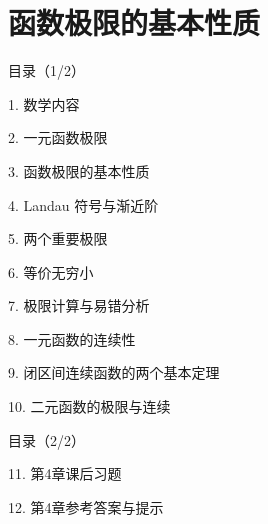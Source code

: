 \documentclass[aspectratio=169,10pt,fontset=fandol]{ctexbeamer}
\begin{document}
\section{函数极限的基本性质}
\begin{frame}[t,fragile]{目录（1/2）}
\normalsize
{\color{black}\normalsize 1. 数学内容\par}\vspace{0.3em}
{\color{black}\normalsize 2. 一元函数极限\par}\vspace{0.3em}
{\color{blue}\normalsize 3. 函数极限的基本性质\par}\vspace{0.3em}
{\color{gray!40}\normalsize 4. Landau 符号与渐近阶\par}\vspace{0.3em}
{\color{gray!40}\normalsize 5. 两个重要极限\par}\vspace{0.3em}
{\color{gray!40}\normalsize 6. 等价无穷小\par}\vspace{0.3em}
{\color{gray!40}\normalsize 7. 极限计算与易错分析\par}\vspace{0.3em}
{\color{gray!40}\normalsize 8. 一元函数的连续性\par}\vspace{0.3em}
{\color{gray!40}\normalsize 9. 闭区间连续函数的两个基本定理\par}\vspace{0.3em}
{\color{gray!40}\normalsize 10. 二元函数的极限与连续\par}\vspace{0.3em}
\end{frame}
\begin{frame}[t,fragile]{目录（2/2）}
\normalsize
{\color{gray!40}\normalsize 11. 第4章课后习题\par}\vspace{0.3em}
{\color{gray!40}\normalsize 12. 第4章参考答案与提示\par}\vspace{0.3em}
\end{frame}
\end{document}
